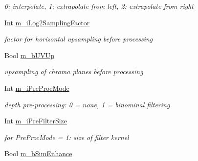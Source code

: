 \begin{DoxyCompactItemize}
\begin{DoxyCompactList}\small\item\em 0\+: interpolate, 1\+: extrapolate from left, 2\+: extrapolate from right \end{DoxyCompactList}\item 
\mbox{\label{class_t_app_renderer_cfg_a0f4aadd93f3175dc2182e7b9ee120a15}} 
Int \hyperlink{class_t_app_renderer_cfg_a0f4aadd93f3175dc2182e7b9ee120a15}{m\+\_\+i\+Log2\+Sampling\+Factor}
\begin{DoxyCompactList}\small\item\em factor for horizontal upsampling before processing \end{DoxyCompactList}\item 
\mbox{\label{class_t_app_renderer_cfg_a26d00299e52cb97593874c96f00348a7}} 
Bool \hyperlink{class_t_app_renderer_cfg_a26d00299e52cb97593874c96f00348a7}{m\+\_\+b\+U\+V\+Up}
\begin{DoxyCompactList}\small\item\em upsampling of chroma planes before processing \end{DoxyCompactList}\item 
\mbox{\label{class_t_app_renderer_cfg_a6cb27ce865d0bf2454dbd1b9ccd9c99d}} 
Int \hyperlink{class_t_app_renderer_cfg_a6cb27ce865d0bf2454dbd1b9ccd9c99d}{m\+\_\+i\+Pre\+Proc\+Mode}
\begin{DoxyCompactList}\small\item\em depth pre-\/processing\+: 0 = none, 1 = binominal filtering \end{DoxyCompactList}\item 
\mbox{\label{class_t_app_renderer_cfg_a2e36c503399b059aeae2d33f8a139a83}} 
Int \hyperlink{class_t_app_renderer_cfg_a2e36c503399b059aeae2d33f8a139a83}{m\+\_\+i\+Pre\+Filter\+Size}
\begin{DoxyCompactList}\small\item\em for Pre\+Proc\+Mode = 1\+: size of filter kernel \end{DoxyCompactList}\item 
\mbox{\label{class_t_app_renderer_cfg_ab9b21b9746b4a12cd86916c5771272c1}} 
Bool \hyperlink{class_t_app_renderer_cfg_ab9b21b9746b4a12cd86916c5771272c1}{m\+\_\+b\+Sim\+Enhance}

\end{DoxyCompactItemize}
